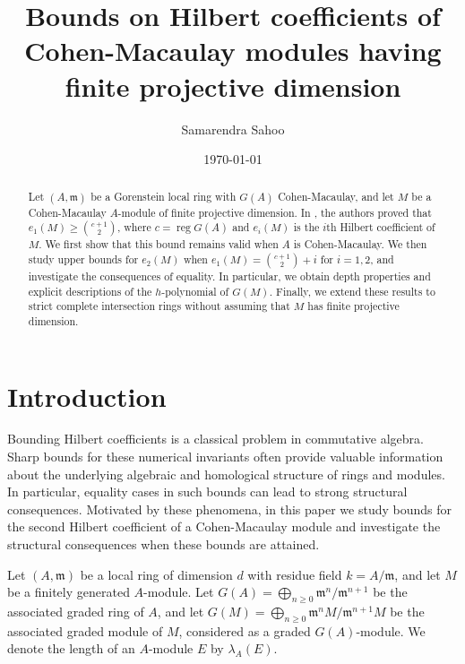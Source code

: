 \documentclass[11pt]{amsart}
\theoremstyle{plain}
\theoremstyle{plain}
\begin{document}
\title{\large \textbf{Bounds on Hilbert coefficients of Cohen-Macaulay modules having finite projective dimension}}


\author{Samarendra Sahoo}
\address{ Indian Institute of Technology Dharwad, Dharwad 580011, Karnataka, India}
\date{\today}



\begin{abstract}
Let $(A,\mathfrak{m})$ be a Gorenstein local ring with $G(A)$ Cohen-Macaulay, and let $M$ be a Cohen-Macaulay $A$-module of finite projective dimension. In \cite{Quasipure}, the authors proved that $e_1(M)\geq \binom{c+1}{2}$, where $c=\operatorname{reg}G(A)$ and $e_i(M)$ is the $i$th Hilbert coefficient of $M$. We first show that this bound remains valid when $A$ is Cohen-Macaulay. We then study upper bounds for $e_2(M)$ when $e_1(M)=\binom{c+1}{2}+i$ for $i=1,2$, and investigate the consequences of equality. In particular, we obtain depth properties and explicit descriptions of the $h$-polynomial of $G(M)$. Finally, we extend these results to strict complete intersection rings without assuming that $M$ has finite projective dimension.
\end{abstract}





\maketitle


\section{Introduction}

Bounding Hilbert coefficients is a classical problem in commutative algebra. Sharp bounds for these numerical invariants often provide valuable information about the underlying algebraic and homological structure of rings and modules. In particular, equality cases in such bounds can lead to strong structural consequences. Motivated by these phenomena, in this paper we study bounds for the second Hilbert coefficient of a Cohen-Macaulay module and investigate the structural consequences when these bounds are attained.

Let $(A,\mathfrak{m})$ be a local ring of dimension $d$ with residue field $k=A/\mathfrak{m}$, and let $M$ be a finitely generated $A$-module. Let $G(A)=\bigoplus_{n\geq 0}\mathfrak{m}^n/\mathfrak{m}^{n+1}$ be the associated graded ring of $A$, and let $G(M)=\bigoplus_{n\geq 0}\mathfrak{m}^nM/\mathfrak{m}^{n+1}M$ be the associated graded module of $M$, considered as a graded $G(A)$-module. We denote the length of an $A$-module $E$ by $\lambda_A(E)$.
\end{document}
